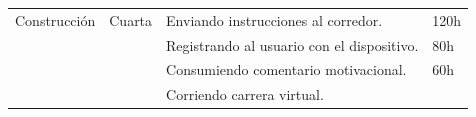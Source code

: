 \begin{longtable}[c]{@{}llll@{}}
\\\noalign{\medskip}
\begin{minipage}[t]{0.17\columnwidth}\raggedright
Construcción
\end{minipage} & \begin{minipage}[t]{0.12\columnwidth}\raggedright
Cuarta
\end{minipage} & \begin{minipage}[t]{0.58\columnwidth}\raggedright
Enviando instrucciones al corredor.
\end{minipage} & \begin{minipage}[t]{0.12\columnwidth}\raggedright
120h
\end{minipage}
\\\noalign{\medskip}
\begin{minipage}[t]{0.17\columnwidth}\raggedright
\end{minipage} & \begin{minipage}[t]{0.12\columnwidth}\raggedright
\end{minipage} & \begin{minipage}[t]{0.58\columnwidth}\raggedright
Registrando al usuario con el dispositivo.
\end{minipage} & \begin{minipage}[t]{0.12\columnwidth}\raggedright
80h
\end{minipage}
\\\noalign{\medskip}
\begin{minipage}[t]{0.17\columnwidth}\raggedright
\end{minipage} & \begin{minipage}[t]{0.12\columnwidth}\raggedright
\end{minipage} & \begin{minipage}[t]{0.58\columnwidth}\raggedright
Consumiendo comentario motivacional.
\end{minipage} & \begin{minipage}[t]{0.12\columnwidth}\raggedright
60h
\end{minipage}
\\\noalign{\medskip}
\begin{minipage}[t]{0.17\columnwidth}\raggedright
\end{minipage} & \begin{minipage}[t]{0.12\columnwidth}\raggedright
\end{minipage} & \begin{minipage}[t]{0.58\columnwidth}\raggedright
Corriendo carrera virtual.
\end{minipage} & \begin{minipage}[t]{0.12\columnwidth}\raggedright

\end{minipage}
\end{longtable}
